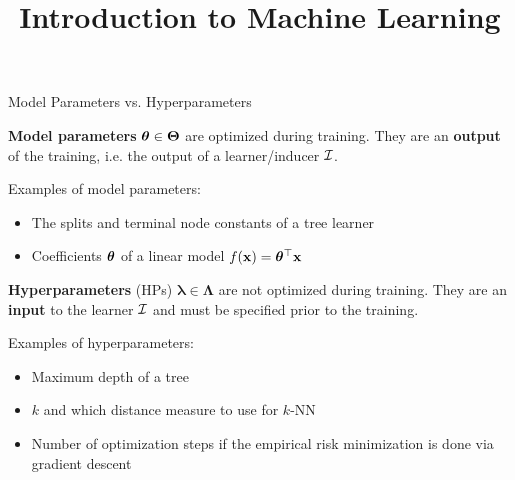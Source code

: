 \documentclass[11pt,compress,t,notes=noshow, xcolor=table]{beamer}
\title{Introduction to Machine Learning}
\institute{\href{https://compstat-lmu.github.io/lecture_i2ml/}{compstat-lmu.github.io/lecture\_i2ml}}
\date{}
\begin{document}
\sloppy

\begin{vbframe}{Model Parameters vs. Hyperparameters} 

\textbf{Model parameters} $\bm{\theta} \in \bm\Theta$ are optimized during training. %
They are an \textbf{output} of the training, i.e. the output of a learner/inducer $\mathcal{I}$. 

\lz

Examples of model parameters:
\begin{itemize}
\item The splits and terminal node constants of a tree learner 
\item Coefficients $\bm{\theta}$ of a linear model $f(\mathbf{x}) = \bm{\theta}^\top \mathbf{x}$
\end{itemize}

\lz

\textbf{Hyperparameters} (HPs) $\bm\lambda \in \bm\Lambda$ are not optimized during training. 
They are an \textbf{input} to the learner $\mathcal{I}$ and must be specified prior to the training. 

\lz

Examples of hyperparameters:

\begin{itemize}
\item Maximum depth of a tree 
\item $k$ and which distance measure to use for $k$-NN
\item Number of optimization steps if the empirical risk minimization
is done via gradient descent
\end{itemize}

\end{vbframe}
\end{document}
